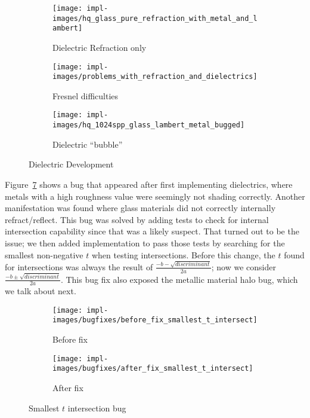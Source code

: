 \vspace{0.3em}
\begin{figure}[htb]
  \centering
  \begin{subfigure}[htb]{0.3\textwidth}
    \texttt{[image: impl-images/hq\_glass\_pure\_refraction\_with\_metal\_and\_lambert]}
    \caption{Dielectric Refraction only}
    \label{fig:rayterm-cpu_dielectric_pure_refraction}
  \end{subfigure}
  \begin{subfigure}[htb]{0.3\textwidth}
    \texttt{[image: impl-images/problems\_with\_refraction\_and\_dielectrics]}
    \caption{Fresnel difficulties}
    \label{fig:rayterm-cpu_dielectric_frensel_difficulties}
  \end{subfigure}
  \begin{subfigure}[htb]{0.3\textwidth}
    \texttt{[image: impl-images/hq\_1024spp\_glass\_lambert\_metal\_bugged]}
    \caption{Dielectric ``bubble''}
    \label{fig:rayterm-cpu_dielectric_metallic_bug}
  \end{subfigure}
  \caption{Dielectric Development}
  \label{fig:rayterm-cpu_dielectric_development}
\end{figure}

Figure~\ref{fig:rayterm-cpu_t_intersection_bug} shows a bug that appeared after first implementing dielectrics, where metals with a high roughness value were seemingly not shading correctly.
Another manifestation was found where glass materials did not correctly internally refract/reflect.
This bug was solved by adding tests to check for internal intersection capability since that was a likely suspect.
That turned out to be the issue; we then added implementation to pass those tests by searching for the smallest non-negative $t$ when testing intersections.
Before this change, the $t$ found for intersections was always the result of $\frac{-b - \sqrt{discriminant}}{2a}$; now we consider $\frac{-b \pm \sqrt{discriminant}}{2a}$.
This bug fix also exposed the metallic material halo bug, which we talk about next.

\vspace{0.3em}
\begin{figure}[htb]
  \centering
  \begin{subfigure}[htb]{0.45\textwidth}
    \texttt{[image: impl-images/bugfixes/before\_fix\_smallest\_t\_intersect]}
    \caption{Before fix}
    \label{fig:rayterm-cpu_t_intersection_before}
  \end{subfigure}
  \begin{subfigure}[htb]{0.45\textwidth}
    \texttt{[image: impl-images/bugfixes/after\_fix\_smallest\_t\_intersect]}
    \caption{After fix}
    \label{fig:rayterm-cpu_t_intersection_after}
  \end{subfigure}
  \caption{Smallest $t$ intersection bug}
  \label{fig:rayterm-cpu_t_intersection_bug}
\end{figure}

